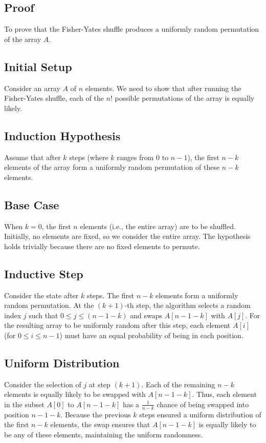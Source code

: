 \documentclass{article}
\begin{document}
\subsection*{Proof}
To prove that the Fisher-Yates shuffle produces a uniformly random permutation of the array \( A \).

\subsection*{Initial Setup}
Consider an array \( A \) of \( n \) elements. We need to show that after running the Fisher-Yates shuffle, each of the \( n! \) possible permutations of the array is equally likely.

\subsection*{Induction Hypothesis}
Assume that after \( k \) steps (where \( k \) ranges from \( 0 \) to \( n-1 \)), the first \( n-k \) elements of the array form a uniformly random permutation of these \( n-k \) elements.

\subsection*{Base Case}
When \( k = 0 \), the first \( n \) elements (i.e., the entire array) are to be shuffled. Initially, no elements are fixed, so we consider the entire array. The hypothesis holds trivially because there are no fixed elements to permute.

\subsection*{Inductive Step}
Consider the state after \( k \) steps. The first \( n-k \) elements form a uniformly random permutation. At the \( (k+1) \)-th step, the algorithm selects a random index \( j \) such that \( 0 \leq j \leq (n-1-k) \) and swaps \( A[n-1-k] \) with \( A[j] \). For the resulting array to be uniformly random after this step, each element \( A[i] \) (for \( 0 \leq i \leq n-1 \)) must have an equal probability of being in each position.

\subsection*{Uniform Distribution}
Consider the selection of \( j \) at step \( (k+1) \). Each of the remaining \( n-k \) elements is equally likely to be swapped with \( A[n-1-k] \). Thus, each element in the subset \( A[0] \) to \( A[n-1-k] \) has a \( \frac{1}{n-k} \) chance of being swapped into position \( n-1-k \). Because the previous \( k \) steps ensured a uniform distribution of the first \( n-k \) elements, the swap ensures that \( A[n-1-k] \) is equally likely to be any of these elements, maintaining the uniform randomness.
\end{document}
